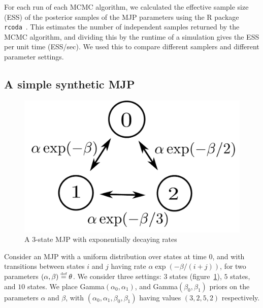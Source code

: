 For each run of each MCMC algorithm, we calculated the effective sample size (ESS) of the posterior samples of the MJP parameters using the R package \texttt{rcoda}~\citep{Rcoda2006}. 
This estimates the number of independent samples returned by the MCMC algorithm, and dividing this by the runtime of a simulation gives the ESS per unit time (ESS/sec). 
We used this to compare different samplers and different parameter settings.

\subsection{A simple synthetic MJP}
\begin{figure}
    \vspace{-.3in}
  \begin{minipage}[!hp]{.05\linewidth}
    \hspace{.1in}
  \end{minipage}
  \begin{minipage}[!hp]{.9\linewidth}
  \centering
    \includegraphics [width=\textwidth, angle=0]{figs/exp_model.pdf}
    \caption{A 3-state MJP with exponentially decaying rates}
    \label{fig:exp_model}
      \end{minipage}
  \end{figure}
  Consider an MJP with a uniform distribution over states at time $0$, and with transitions between states $i$ and $j$ having rate $\alpha \exp(-\beta/(i+j))$, for two parameters $(\alpha,\beta) \defeq \theta$. 
We consider three settings: $3$ states (figure~\ref{fig:exp_model}), $5$ states, and $10$ states.
We place Gamma$(\alpha_0,\alpha_1)$, and Gamma$(\beta_0, \beta_1)$ priors on the parameters $\alpha$ and $\beta$, with $(\alpha_0,\alpha_1,\beta_0,\beta_1)$ having values $(3,2,5,2)$ respectively. 
